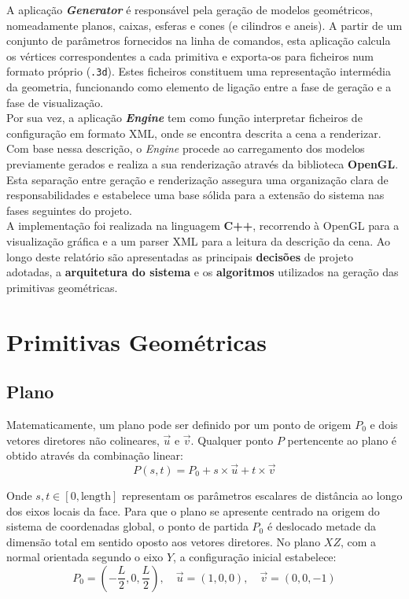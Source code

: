 \documentclass[11pt, a4paper, fleqn]{article}
\begin{document}
\noindent A aplicação \textbf{\textit{Generator}} é responsável pela geração de modelos geométricos, nomeadamente planos, caixas, esferas e cones (e cilindros e aneis). A partir de um conjunto de parâmetros fornecidos na linha de comandos, esta aplicação calcula os vértices correspondentes a cada primitiva e exporta-os para ficheiros num formato próprio (\texttt{.3d}). Estes ficheiros constituem uma representação intermédia da geometria, funcionando como elemento de ligação entre a fase de geração e a fase de visualização. \\

\noindent Por sua vez, a aplicação \textbf{\textit{Engine}} tem como função interpretar ficheiros de configuração em formato XML, onde se encontra descrita a cena a renderizar. Com base nessa descrição, o \textit{Engine} procede ao carregamento dos modelos previamente gerados e realiza a sua renderização através da biblioteca \textbf{OpenGL}. Esta separação entre geração e renderização assegura uma organização clara de responsabilidades e estabelece uma base sólida para a extensão do sistema nas fases seguintes do projeto. \\

\noindent A implementação foi realizada na linguagem \textbf{C++}, recorrendo à OpenGL para a visualização gráfica e a um parser XML para a leitura da descrição da cena. Ao longo deste relatório são apresentadas as principais \textbf{decisões} de projeto adotadas, a \textbf{arquitetura do sistema} e os \textbf{algoritmos} utilizados na geração das primitivas geométricas.

\newpage

\section{Primitivas Geométricas}

\subsection{Plano}

Matematicamente, um plano pode ser definido por um ponto de origem $P_0$ e dois vetores diretores não colineares, $\vec{u}$ e $\vec{v}$. Qualquer ponto $P$ pertencente ao plano é obtido através da combinação linear:
\[
P(s, t) = P_0 + s \times \vec{u} + t \times \vec{v}
\]

\noindent Onde $s, t \in [0, \text{length}]$ representam os parâmetros escalares de distância ao longo dos eixos locais da face. Para que o plano se apresente centrado na origem do sistema de coordenadas global, o ponto de partida $P_0$ é deslocado metade da dimensão total em sentido oposto aos vetores diretores. No plano $XZ$, com a normal orientada segundo o eixo $Y$, a configuração inicial estabelece:
\[
P_0 = \left( -\frac{L}{2}, 0, \frac{L}{2} \right), \quad \vec{u} = (1, 0, 0), \quad \vec{v} = (0, 0, -1)
\]
\end{document}
